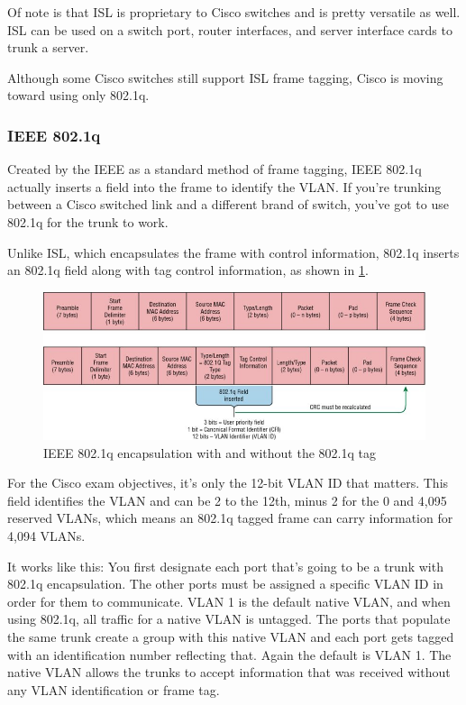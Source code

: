 \documentclass[b5paper,11pt]{memoir}
\begin{document}
Of note is that ISL is proprietary to Cisco switches and is pretty
versatile as well. ISL can be used on a switch port, router interfaces,
and server interface cards to trunk a server.

Although some Cisco switches still support ISL frame tagging, Cisco is moving toward using only 802.1q.

\subsubsection{IEEE 802.1q}

Created by the IEEE as a standard method of frame tagging, IEEE 802.1q actually inserts a field into the frame to identify the VLAN.
If you're trunking between a Cisco switched link and a different brand of switch, you've got to use 802.1q for the trunk to work.

Unlike ISL, which encapsulates the frame with control information, 802.1q inserts an 802.1q field along with tag control information, as
shown in \cref{fig:802.1q-encapsulation}.


\begin{figure}
   \centering
   \includegraphics[width=.7\textwidth]{images/c11f007.jpg}
   \caption{IEEE 802.1q encapsulation with and without the 802.1q tag}
   \label{fig:802.1q-encapsulation}
\end{figure}


For the Cisco exam objectives, it's only the 12-bit VLAN ID that
matters. This field identifies the VLAN and can be 2 to the 12th, minus
2 for the 0 and 4,095 reserved VLANs, which means an 802.1q tagged frame
can carry information for 4,094 VLANs.

It works like this: You first designate each port that's going to be a
trunk with 802.1q encapsulation. The other ports must be assigned a
specific VLAN ID in order for them to communicate. VLAN 1 is the default
native VLAN, and when using 802.1q, all traffic for a native VLAN is
untagged. The ports that populate the same trunk create a group with
this native VLAN and each port gets tagged with an identification number
reflecting that. Again the default is VLAN 1. The native VLAN allows the
trunks to accept information that was received without any VLAN
identification or frame tag.
\end{document}
